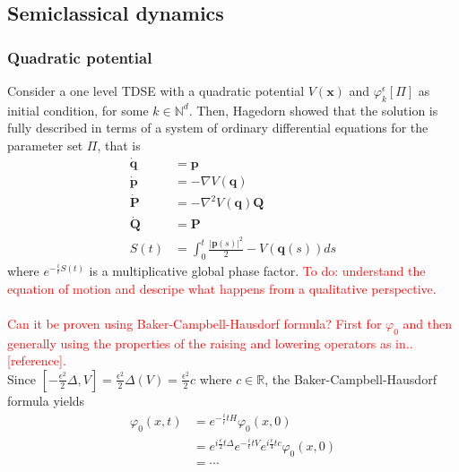 \usepackage{amsmath}


\subsection{Semiclassical dynamics}
\subsubsection{Quadratic potential}
Consider a one level TDSE with a quadratic potential 
$V(\bm{x})$ and $\varphi_k^{\epsilon}[\Pi]$ as initial condition, 
for some $k \in \mathbb{N}^d$. 
Then, Hagedorn showed that the solution is fully described in 
terms of a system of ordinary differential equations for the parameter set $\Pi$,
that is
\begin{align}
  \dot{\bm{q}} &= \bm{p}
    \label{hagedorn:hagedorn_dynamics:parameters:evolution:q}
    \\
  \dot{\bm{p}} &=-\nabla V(\bm{q})
    \label{hagedorn:hagedorn_dynamics:parameters:evolution:p}
    \\
  \dot{\bm{P}} &=-\nabla^2 V(\bm{q})\bm{Q}
    \label{hagedorn:hagedorn_dynamics:parameters:evolution:P}
    \\
    \dot{\bm{Q}} &= \bm{P}
    \label{hagedorn:hagedorn_dynamics:parameters:evolution:Q}
    \\
    S(t) &= \int_0^t \frac{|\bm{p}(s)|^2}{2} - V(\bm{q}(s))  ds
    \label{hagedorn:hagedorn_dynamics:parameters:evolution:S}
\end{align}
where $e^{-\frac{i}{\epsilon}S(t)}$ is a multiplicative global phase 
factor.
\textcolor{red}{To do: understand the equation of motion and descripe what 
happens from a qualitative perspective.}
\\\\
\textcolor{red}{Can it be proven using Baker-Campbell-Hausdorf formula? First for 
$\varphi_0$ and then generally using the properties of the raising and lowering 
operators as in..[reference].}
\\
Since 
   $ \left[
      -\frac{\epsilon^2}{2} \Delta, V
    \right]
    =
    \frac{\epsilon^2}{2} \Delta (V)
    = 
    \frac{\epsilon^2}{2} c 
  $
  where $c \in \mathbb{R}$, the Baker-Campbell-Hausdorf formula yields 
  \begin{equation}
    \begin{split}
      \varphi_{0}(x,t) &= e^{-\frac{i}{\epsilon}t H } \varphi_{0}(x,0) 
      \\
      &=
      e^{i\frac{\epsilon}{2}t \Delta} e^{-\frac{i}{\epsilon}tV} e^{i\frac{\epsilon}{4}t c} \varphi_{0}(x,0)
      \\
      &= \cdots
    \end{split}
  \end{equation}
%
%
%
%
%
